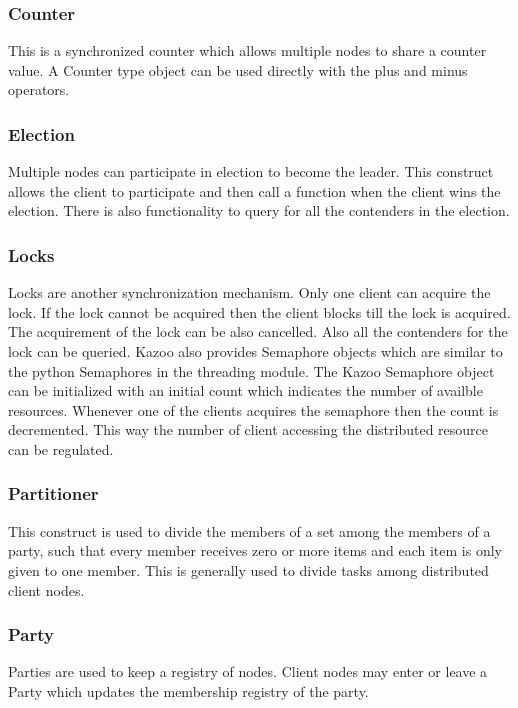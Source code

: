   \subsubsection{Counter}
  This is a synchronized counter which allows multiple nodes to share a counter value. A Counter type object can be used directly with the plus and minus operators.
  \subsubsection{Election}
  Multiple nodes can participate in election to become the leader. This construct allows the client to participate and then call a function when the client wins the election. There is also functionality to query for all the contenders in the election.
  \subsubsection{Locks}
    Locks are another synchronization mechanism. Only one client can acquire the lock. If the lock cannot be acquired then the client blocks till the lock is acquired. The acquirement of the lock can be also cancelled. Also all the contenders for the lock can be queried. Kazoo also provides Semaphore objects which are similar to the python Semaphores in the threading module. The Kazoo Semaphore object can be initialized with an initial count which indicates the number of availble resources. Whenever one of the clients acquires the semaphore then the count is decremented. This way the number of client accessing the distributed resource can be regulated.
  \subsubsection{Partitioner}
  This construct is used to divide the members of a set among the members of a party, such that every member receives zero or more items and each item is only given to one member. This is generally used to divide tasks among distributed client nodes.
  \subsubsection{Party}
    Parties are used to keep a registry of nodes. Client nodes may enter or leave a Party which updates the membership registry of the party.

